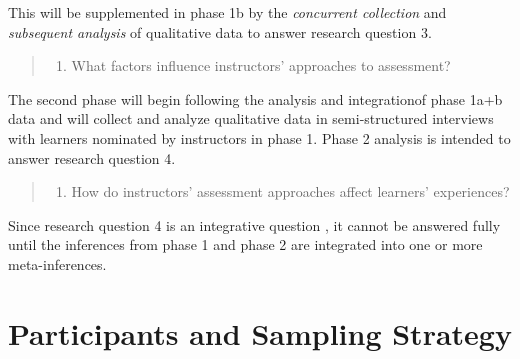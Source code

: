 \documentclass[
]{book}
\providecommand{\tightlist}{%
  \setlength{\itemsep}{0pt}\setlength{\parskip}{0pt}}
\begin{document}
This will be supplemented in phase 1b by the \emph{concurrent collection} and \emph{subsequent analysis} of qualitative data to answer research question 3.

\begin{quote}
\begin{enumerate}
\def\labelenumi{\arabic{enumi}.}
\setcounter{enumi}{2}
\tightlist
\item
  What factors influence instructors' approaches to assessment?
\end{enumerate}
\end{quote}

The second phase will begin following the analysis and integrationof phase 1a+b data and will collect and analyze qualitative data in semi-structured interviews with learners nominated by instructors in phase 1. Phase 2 analysis is intended to answer research question 4.

\begin{quote}
\begin{enumerate}
\def\labelenumi{\arabic{enumi}.}
\setcounter{enumi}{3}
\tightlist
\item
  How do instructors' assessment approaches affect learners' experiences?
\end{enumerate}
\end{quote}

Since research question 4 is an integrative question \citep{creamerIntroductionFullyIntegrated2018}, it cannot be answered fully until the inferences from phase 1 and phase 2 are integrated into one or more meta-inferences.

\hypertarget{participants-and-sampling-strategy}{%
\section{Participants and Sampling Strategy}\label{participants-and-sampling-strategy}}
\end{document}
